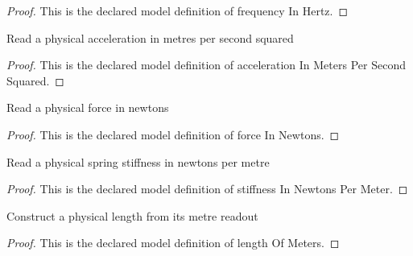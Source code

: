 \begin{proof}
  This is the declared model definition of frequency In Hertz.
\end{proof}
\begin{definition}
  \label{def:physics:phyx-mini-0231:phyxminiproblems-problemphyxmini0231-accelerationinmeterspersecondsquared}
  Read a physical acceleration in metres per second squared
\end{definition}
\begin{proof}
  This is the declared model definition of acceleration In Meters Per Second Squared.
\end{proof}
\begin{definition}
  \label{def:physics:phyx-mini-0231:phyxminiproblems-problemphyxmini0231-forceinnewtons}
  Read a physical force in newtons
\end{definition}
\begin{proof}
  This is the declared model definition of force In Newtons.
\end{proof}
\begin{definition}
  \label{def:physics:phyx-mini-0231:phyxminiproblems-problemphyxmini0231-stiffnessinnewtonspermeter}
  Read a physical spring stiffness in newtons per metre
\end{definition}
\begin{proof}
  This is the declared model definition of stiffness In Newtons Per Meter.
\end{proof}
\begin{definition}
  \label{def:physics:phyx-mini-0231:phyxminiproblems-problemphyxmini0231-lengthofmeters}
  Construct a physical length from its metre readout
\end{definition}
\begin{proof}
  This is the declared model definition of length Of Meters.
\end{proof}
